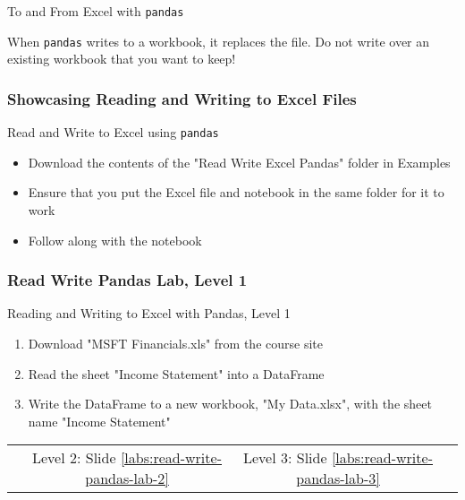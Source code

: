 \documentclass[handout, 11pt]{beamer}
\begin{document}
\begin{section}{To and From Excel with \texttt{pandas}}
\begin{frame}[fragile]
\begin{alertblock}
When
\texttt{pandas}
writes to a workbook, it replaces the file. Do not write over an existing workbook that you want to keep!
\end{alertblock}
\end{frame}
\begin{frame}
\frametitle{Showcasing Reading and Writing to Excel Files}
{
\begin{block}{Read and Write to Excel using \texttt{pandas}}
\begin{itemize}
\item Download the contents of the "Read Write Excel Pandas" folder in Examples
\item Ensure that you put the Excel file and notebook in the same folder for it to work
\item Follow along with the notebook
\end{itemize}
\end{block}
}
\end{frame}
\begin{frame}
\frametitle{Read Write Pandas Lab, Level 1}
{
\begin{block}{Reading and Writing to Excel with Pandas, Level 1}
\begin{enumerate}
\item Download "MSFT Financials.xls" from the course site
\item Read the sheet "Income Statement" into a DataFrame
\item Write the DataFrame to a new workbook, "My Data.xlsx", with the sheet name "Income Statement"
\end{enumerate}
\vfill
\begin{tabular*}{\textwidth}{@{\extracolsep{\fill}}cccc}
\toprule
\hfill & Level 2: Slide \textcolor{blue}{\underline{\ref{labs:read-write-pandas-lab-2}}} & Level 3: Slide \textcolor{blue}{\underline{\ref{labs:read-write-pandas-lab-3}}} & \hfill\\

\end{tabular*}
\end{block}
}
\label{labs:read-write-pandas-lab-1}
\end{frame}
\end{section}
\end{document}
